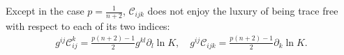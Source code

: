 \documentclass{amsart}
\theoremstyle{definition}
\theoremstyle{remark}
\numberwithin{equation}{section}
\begin{document}
Except in the case $ p =\frac{1}{n+2}$, $\mathcal{C}_{ijk}$ does not enjoy the luxury of being trace free with respect to each of its two indices:
\begin{align}
g^{ij}\mathcal{C}_{ij}^k=\frac{ p (n+2)-1}{2}g^{kl}\partial_l\ln K,\quad g^{ij}\mathcal{C}_{ijk}=\frac{ p (n+2)-1}{2}\partial_k\ln K.
\end{align}
\end{document}
